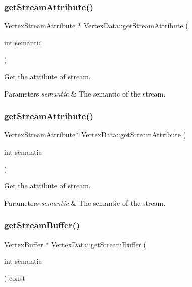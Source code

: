 \subsubsection{\texorpdfstring{get\+Stream\+Attribute()}{getStreamAttribute()}\hspace{0.1cm}{\footnotesize\ttfamily [3/4]}}
{\footnotesize\ttfamily \hyperlink{structVertexStreamAttribute}{Vertex\+Stream\+Attribute} $\ast$ Vertex\+Data\+::get\+Stream\+Attribute (\begin{DoxyParamCaption}\item[{int}]{semantic }\end{DoxyParamCaption})}

Get the attribute of stream. 
\begin{DoxyParams}{Parameters}
{\em semantic} & The semantic of the stream. \\
\hline
\end{DoxyParams}
\mbox{\label{classVertexData_a4240665844704a386ae7436f097e0cb8}} 
\subsubsection{\texorpdfstring{get\+Stream\+Attribute()}{getStreamAttribute()}\hspace{0.1cm}{\footnotesize\ttfamily [4/4]}}
{\footnotesize\ttfamily \hyperlink{structVertexStreamAttribute}{Vertex\+Stream\+Attribute}$\ast$ Vertex\+Data\+::get\+Stream\+Attribute (\begin{DoxyParamCaption}\item[{int}]{semantic }\end{DoxyParamCaption})}

Get the attribute of stream. 
\begin{DoxyParams}{Parameters}
{\em semantic} & The semantic of the stream. \\
\hline
\end{DoxyParams}
\mbox{\label{classVertexData_a1c3f19c5ecb86192031eca7f8ee09d88}} 
\subsubsection{\texorpdfstring{get\+Stream\+Buffer()}{getStreamBuffer()}\hspace{0.1cm}{\footnotesize\ttfamily [1/2]}}
{\footnotesize\ttfamily \hyperlink{classVertexBuffer}{Vertex\+Buffer} $\ast$ Vertex\+Data\+::get\+Stream\+Buffer (\begin{DoxyParamCaption}\item[{int}]{semantic }\end{DoxyParamCaption}) const}

